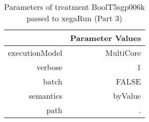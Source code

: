 \begin{table}[ht]
\centering
\begin{tabular}{rr}
  \hline
 & Parameter Values \\ 
  \hline
executionModel & MultiCore \\ 
  verbose & 1 \\ 
  batch & FALSE \\ 
  semantics & byValue \\ 
  path & . \\ 
   \hline
\end{tabular}
\caption{ Parameters of treatment BoolT5sgp006k passed to xegaRun
 (Part 3)} 
\end{table}
